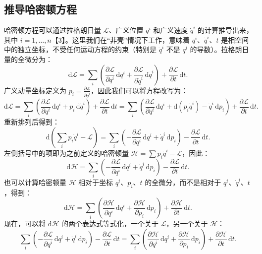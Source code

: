 \subsection{推导哈密顿方程}  
哈密顿方程可以通过拉格朗日量 \( \mathcal{L} \)、广义位置 \( q^i \) 和广义速度 \( \dot{q}^i \) 的计算推导出来，其中 \( i = 1, \ldots, n \)【3】。这里我们在“非壳”情况下工作，意味着 \( q^i \)、\( \dot{q}^i \)、\( t \) 是相空间中的独立坐标，不受任何运动方程的约束（特别是 \( \dot{q}^i \) 不是 \( q^i \) 的导数）。拉格朗日量的全微分为：
\[
\mathrm{d} \mathcal{L} = \sum_{i} \left( \frac{\partial \mathcal{L}}{\partial q^i} \, \mathrm{d} q^i + \frac{\partial \mathcal{L}}{\partial \dot{q}^i} \, \mathrm{d} \dot{q}^i \right) + \frac{\partial \mathcal{L}}{\partial t} \, \mathrm{d} t.~
\]
广义动量坐标定义为 \( p_i = \frac{\partial \mathcal{L}}{\partial \dot{q}^i} \)，因此我们可以将方程改写为：
\[
\mathrm{d} \mathcal{L} = \sum_{i} \left( \frac{\partial \mathcal{L}}{\partial q^i} \, \mathrm{d} q^i + p_i \, \mathrm{d} \dot{q}^i \right) + \frac{\partial \mathcal{L}}{\partial t} \, \mathrm{d} t = \sum_{i} \left( \frac{\partial \mathcal{L}}{\partial q^i} \, \mathrm{d} q^i + \mathrm{d} (p_i \dot{q}^i) - \dot{q}^i \, \mathrm{d} p_i \right) + \frac{\partial \mathcal{L}}{\partial t} \, \mathrm{d} t.~
\]
重新排列后得到：
\[
\mathrm{d} \left(\sum_{i} p_i \dot{q}^i - \mathcal{L}\right) = \sum_{i} \left( -\frac{\partial \mathcal{L}}{\partial q^i} \, \mathrm{d} q^i + \dot{q}^i \, \mathrm{d} p_i \right) - \frac{\partial \mathcal{L}}{\partial t} \, \mathrm{d} t.~
\]
左侧括号中的项即为之前定义的哈密顿量 \( \mathcal{H} = \sum p_i \dot{q}^i - \mathcal{L} \)，因此：
\[
\mathrm{d} \mathcal{H} = \sum_{i} \left( -\frac{\partial \mathcal{L}}{\partial q^i} \, \mathrm{d} q^i + \dot{q}^i \, \mathrm{d} p_i \right) - \frac{\partial \mathcal{L}}{\partial t} \, \mathrm{d} t.~
\]
也可以计算哈密顿量 \( \mathcal{H} \) 相对于坐标 \( q^i \)、\( p_i \)、\( t \) 的全微分，而不是相对于 \( q^i \)、\( \dot{q}^i \)、\( t \)，得到：
\[
\mathrm{d} \mathcal{H} = \sum_{i} \left( \frac{\partial \mathcal{H}}{\partial q^i} \, \mathrm{d} q^i + \frac{\partial \mathcal{H}}{\partial p_i} \, \mathrm{d} p_i \right) + \frac{\partial \mathcal{H}}{\partial t} \, \mathrm{d} t.~
\]
现在，可以将 \( \mathrm{d}\mathcal{H} \) 的两个表达式等式化，一个关于 \( \mathcal{L} \)，另一个关于 \( \mathcal{H} \)：
\[
\sum_{i} \left( -\frac{\partial \mathcal{L}}{\partial q^i} \, \mathrm{d} q^i + \dot{q}^i \, \mathrm{d} p_i \right) - \frac{\partial \mathcal{L}}{\partial t} \, \mathrm{d} t = \sum_{i} \left( \frac{\partial \mathcal{H}}{\partial q^i} \, \mathrm{d} q^i + \frac{\partial \mathcal{H}}{\partial p_i} \, \mathrm{d} p_i \right) + \frac{\partial \mathcal{H}}{\partial t} \, \mathrm{d} t.~
\]
